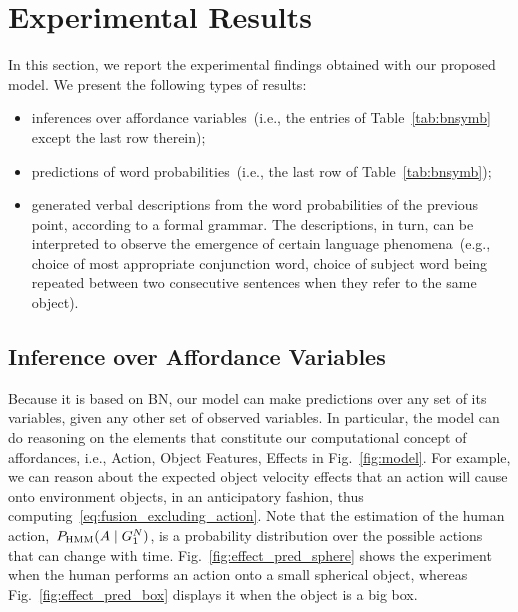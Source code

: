 
\section{Experimental Results}

In this section, we report the experimental findings obtained with our proposed model.
We present the following types of results:
\begin{itemize}
  \item inferences over affordance variables~(i.e., the entries of Table~\ref{tab:bnsymb} except the last row therein);

  \item predictions of word probabilities~(i.e., the last row of Table~\ref{tab:bnsymb});

  \item generated verbal descriptions from the word probabilities of the previous point, according to a formal grammar. The descriptions, in turn, can be interpreted to observe the emergence of certain language phenomena~(e.g., choice of most appropriate conjunction word, choice of subject word being repeated between two consecutive sentences when they refer to the same object).
\end{itemize}

\subsection{Inference over Affordance Variables}

%

Because it is based on \ac{BN}, our model can make predictions over any set of its variables, given any other set of observed variables.
In particular, the model can do reasoning on the elements that constitute our computational concept of affordances, i.e., Action, Object Features, Effects in Fig.~\ref{fig:model}.
For example, we can reason about the expected object velocity effects that an action will cause onto environment objects, in an anticipatory fashion, thus computing~\eqref{eq:fusion_excluding_action}.
Note that the estimation of the human action,~$P_{\text{HMM}}(A \mid G_1^N)$, is a probability distribution over the possible actions that can change with time.
Fig.~\ref{fig:effect_pred_sphere} shows the experiment when the human performs an action onto a small spherical object, whereas Fig.~\ref{fig:effect_pred_box} displays it when the object is a big box.

